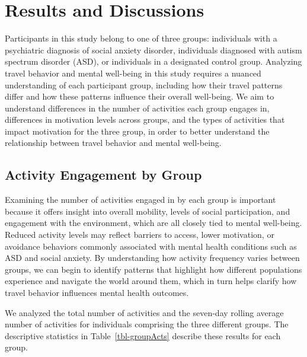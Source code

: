 \documentclass[
  letterpaper,
  number,
  review,
  3p]{elsarticle}
\begin{document}

\section{Results and Discussions}\label{results-and-discussions}

Participants in this study belong to one of three groups: individuals
with a psychiatric diagnosis of social anxiety disorder, individuals
diagnosed with autism spectrum disorder (ASD), or individuals in a
designated control group. Analyzing travel behavior and mental
well-being in this study requires a nuanced understanding of each
participant group, including how their travel patterns differ and how
these patterns influence their overall well-being. We aim to understand
differences in the number of activities each group engages in,
differences in motivation levels across groups, and the types of
activities that impact motivation for the three group, in order to
better understand the relationship between travel behavior and mental
well-being.

\subsection{Activity Engagement by
Group}\label{activity-engagement-by-group}

Examining the number of activities engaged in by each group is important
because it offers insight into overall mobility, levels of social
participation, and engagement with the environment, which are all
closely tied to mental well-being. Reduced activity levels may reflect
barriers to access, lower motivation, or avoidance behaviors commonly
associated with mental health conditions such as ASD and social anxiety.
By understanding how activity frequency varies between groups, we can
begin to identify patterns that highlight how different populations
experience and navigate the world around them, which in turn helps
clarify how travel behavior influences mental health outcomes.

We analyzed the total number of activities and the seven-day rolling
average number of activities for individuals comprising the three
different groups. The descriptive statistics in
Table~\ref{tbl-groupActs} describe these results for each group.
\end{document}
